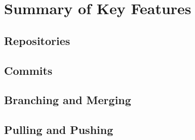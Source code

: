 \section{Summary of Key Features}
\subsection{Repositories}
\subsection{Commits}
\newpage
\subsection{Branching and Merging}
\newpage
\subsection{Pulling and Pushing}
\newpage
